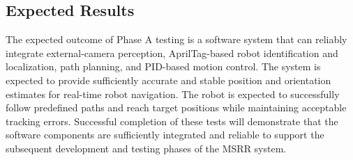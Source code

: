 \documentclass[12pt,a4paper]{article}
\begin{document}
	\subsection{Expected Results}
	The expected outcome of Phase A testing is a software system that can reliably integrate external-camera perception, AprilTag-based robot identification and localization, path planning, and PID-based motion control. The system is expected to provide sufficiently accurate and stable position and orientation estimates for real-time robot navigation.
	The robot is expected to successfully follow predefined paths and reach target positions while maintaining acceptable tracking errors. Successful completion of these tests will demonstrate that the software components are sufficiently integrated and reliable to support the subsequent development and testing phases of the MSRR system.
\end{document}
